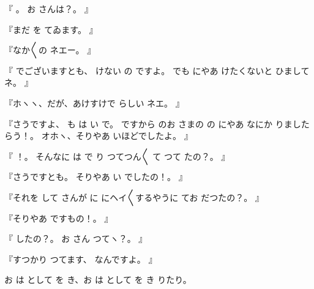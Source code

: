 『
。
お
さんは？。
』

『まだ
を
てゐます。
』

『なか〳〵の
ネエー。
』

『
でございますとも、
けない
の
ですよ。
でも
にやあ
けたくないと
ひましてネ。
』

『ホヽヽ、だが、あけすけで
らしい
ネエ。
』

『さうですよ、
も
は
い
で。
ですから
のお
さまの
の
にやあ
なにか
りましたらう！。
オホヽ、そりやあ
いほどでしたよ。
』

『
！。
そんなに
は
で
り
つてつん〳〵
て
つて
たの？。
』

『さうですとも。
そりやあ
い
でしたの！。
』

『それを
して
さんが
に
にヘイ〳〵するやうに
てお
だつたの？。
』

『そりやあ
ですもの！。
』

『
したの？。
お
さん
つてヽ？。
』

『すつかり
つてます、
なんですよ。
』

お
は
として
を
き、お
は
として
を
き
りたり。

